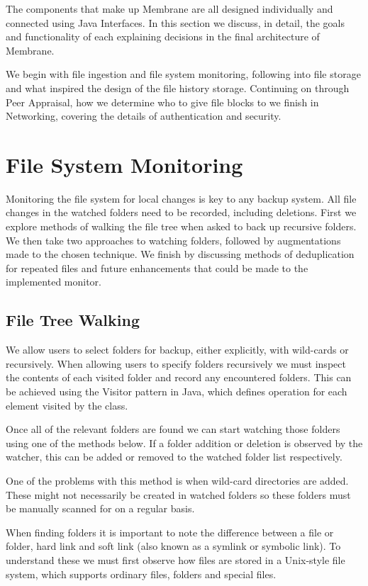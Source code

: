 \documentclass[11pt, a4paper, twocolumn, twoside]{report}
\begin{document}
The components that make up Membrane are all designed individually and connected using Java Interfaces. In this section we discuss, in detail, the goals and functionality of each explaining decisions in the final architecture of Membrane.

We begin with file ingestion and file system monitoring, following into file storage and what inspired the design of the file history storage. Continuing on through Peer Appraisal, how we determine who to give file blocks to we finish in Networking, covering the details of authentication and security.

\section{File System Monitoring}

Monitoring the file system for local changes is key to any backup system. All file changes in the watched folders need to be recorded, including deletions. First we explore methods of walking the file tree when asked to back up recursive folders. We then take two approaches to watching folders, followed by augmentations made to the chosen technique. We finish by discussing methods of deduplication for repeated files and future enhancements that could be made to the implemented monitor.

\subsection{File Tree Walking}

We allow users to select folders for backup, either explicitly, with wild-cards or recursively. When allowing users to specify folders recursively we must inspect the contents of each visited folder and record any encountered folders. This can be achieved using the Visitor pattern in Java, which defines operation for each element visited by the class. \citep{sugrue2010visitor}

Once all of the relevant folders are found we can start watching those folders using one of the methods below. If a folder addition or deletion is observed by the watcher, this can be added or removed to the watched folder list respectively.

One of the problems with this method is when wild-card directories are added. These might not necessarily be created in watched folders so these folders must be manually scanned for on a regular basis.

When finding folders it is important to note the difference between a file or folder, hard link and soft link (also known as a symlink or symbolic link). To understand these we must first observe how files are stored in a Unix-style file system, which supports ordinary files, folders and special files.
\end{document}
